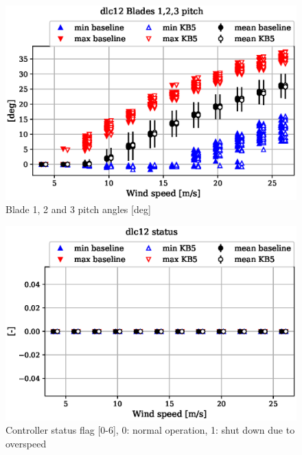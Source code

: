 \begin{figure}[!ht]
\begin{center}
	\includegraphics[width=.85\linewidth]{figures/baseline-vs-KB6/dlc12/bearing-pitch1-angle-deg_AA0008_AA0008.eps}
\end{center}
\caption{Blade 1, 2 and 3 pitch angles [deg]}
\label{fig:baseline-vs-KB6:dlc12:pitch}
\end{figure}

\begin{figure}[!ht]
\begin{center}
	\includegraphics[width=.85\linewidth]{figures/baseline-vs-KB6/dlc12/DLL-dtu_we_controller-inpvec-22_AA0008_AA0008.eps}
\end{center}
\caption{Controller status flag [0-6], 0: normal operation, 1: shut down due to overspeed}
\label{fig:baseline-vs-KB6:dlc12:status}
\end{figure}

